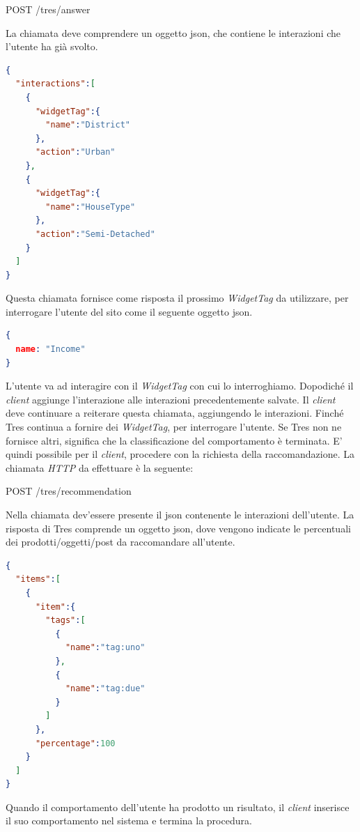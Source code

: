 \begin{center}
POST    /tres/answer
\end{center}
\newpage
La chiamata deve comprendere un oggetto \gls{json}, che contiene le interazioni che l'utente ha già svolto.
\begin{lstlisting}[language=json,firstnumber=1]
{
  "interactions":[
    {
      "widgetTag":{
        "name":"District"
      },
      "action":"Urban"
    },
    {
      "widgetTag":{
        "name":"HouseType"
      },
      "action":"Semi-Detached"
    }  
  ]
}
\end{lstlisting}
Questa chiamata fornisce come risposta il prossimo \emph{WidgetTag} da utilizzare, per interrogare l'utente del sito come il seguente oggetto \gls{json}.
\begin{lstlisting}[language=json,firstnumber=1]
{
  name: "Income"
}
\end{lstlisting}
L'utente va ad interagire con il \emph{WidgetTag} con cui lo interroghiamo. Dopodiché il \emph{client} aggiunge l'interazione alle interazioni precedentemente salvate. Il \emph{client} deve continuare a reiterare questa chiamata, aggiungendo le interazioni. Finché Tres continua a fornire dei \emph{WidgetTag}, per interrogare l'utente. Se Tres non ne fornisce altri, significa che la classificazione del comportamento è terminata. E' quindi possibile per il \emph{client}, procedere con la richiesta della raccomandazione. La chiamata \emph{HTTP} da effettuare è la seguente:
\begin{center}
POST    /tres/recommendation
\end{center}
Nella chiamata dev'essere presente il \gls{json} contenente le interazioni dell'utente. La risposta di Tres comprende un oggetto \gls{json}, dove vengono indicate le percentuali dei prodotti/oggetti/post da raccomandare all'utente.
\begin{lstlisting}[language=json,firstnumber=1]
{
  "items":[
    {
      "item":{
        "tags":[
          {
            "name":"tag:uno"
          },
          {
            "name":"tag:due"
          }
        ]
      },
      "percentage":100
    }
  ]
}
\end{lstlisting}
Quando il comportamento dell'utente ha prodotto un risultato, il \emph{client} inserisce il suo comportamento nel sistema e termina la procedura.
